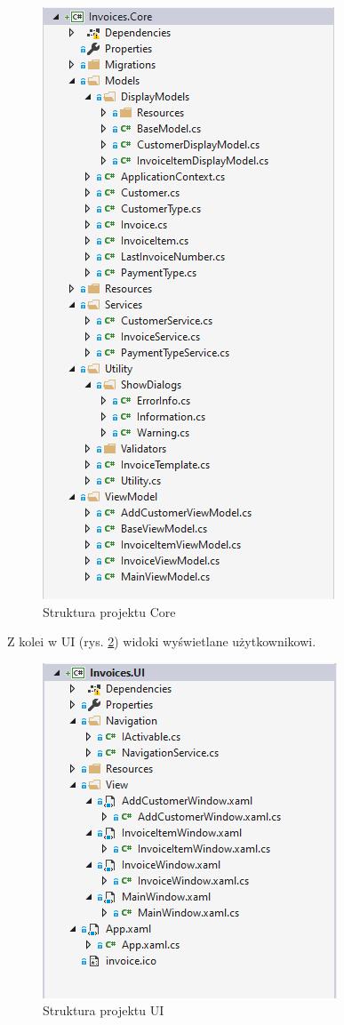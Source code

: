 \begin{figure}[ht!]
\centering
  \includegraphics[width=0.5\linewidth]{Rysunki/core.png}
  \caption{Struktura projektu Core}
  \label{fig:Core}
\end{figure}

Z kolei w UI (rys. \ref{fig:UI}) widoki wyświetlane użytkownikowi.

\begin{figure}[ht!]
\centering
  \includegraphics[width=0.5\linewidth]{Rysunki/ui.png}
  \caption{Struktura projektu UI}
  \label{fig:UI}
\end{figure}

